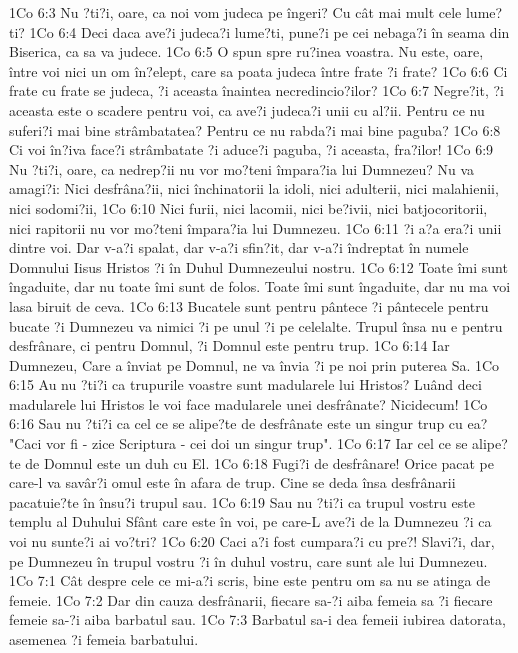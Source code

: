 1Co 6:3  Nu ?ti?i, oare, ca noi vom judeca pe îngeri? Cu cât mai mult cele lume?ti?
1Co 6:4  Deci daca ave?i judeca?i lume?ti, pune?i pe cei nebaga?i în seama din Biserica, ca sa va judece.
1Co 6:5  O spun spre ru?inea voastra. Nu este, oare, între voi nici un om în?elept, care sa poata judeca între frate ?i frate?
1Co 6:6  Ci frate cu frate se judeca, ?i aceasta înaintea necredincio?ilor?
1Co 6:7  Negre?it, ?i aceasta este o scadere pentru voi, ca ave?i judeca?i unii cu al?ii. Pentru ce nu suferi?i mai bine strâmbatatea? Pentru ce nu rabda?i mai bine paguba?
1Co 6:8  Ci voi în?iva face?i strâmbatate ?i aduce?i paguba, ?i aceasta, fra?ilor!
1Co 6:9  Nu ?ti?i, oare, ca nedrep?ii nu vor mo?teni împara?ia lui Dumnezeu? Nu va amagi?i: Nici desfrâna?ii, nici închinatorii la idoli, nici adulterii, nici malahienii, nici sodomi?ii,
1Co 6:10  Nici furii, nici lacomii, nici be?ivii, nici batjocoritorii, nici rapitorii nu vor mo?teni împara?ia lui Dumnezeu.
1Co 6:11  ?i a?a era?i unii dintre voi. Dar v-a?i spalat, dar v-a?i sfin?it, dar v-a?i îndreptat în numele Domnului Iisus Hristos ?i în Duhul Dumnezeului nostru.
1Co 6:12  Toate îmi sunt îngaduite, dar nu toate îmi sunt de folos. Toate îmi sunt îngaduite, dar nu ma voi lasa biruit de ceva.
1Co 6:13  Bucatele sunt pentru pântece ?i pântecele pentru bucate ?i Dumnezeu va nimici ?i pe unul ?i pe celelalte. Trupul însa nu e pentru desfrânare, ci pentru Domnul, ?i Domnul este pentru trup.
1Co 6:14  Iar Dumnezeu, Care a înviat pe Domnul, ne va învia ?i pe noi prin puterea Sa.
1Co 6:15  Au nu ?ti?i ca trupurile voastre sunt madularele lui Hristos? Luând deci madularele lui Hristos le voi face madularele unei desfrânate? Nicidecum!
1Co 6:16  Sau nu ?ti?i ca cel ce se alipe?te de desfrânate este un singur trup cu ea? "Caci vor fi - zice Scriptura - cei doi un singur trup".
1Co 6:17  Iar cel ce se alipe?te de Domnul este un duh cu El.
1Co 6:18  Fugi?i de desfrânare! Orice pacat pe care-l va savâr?i omul este în afara de trup. Cine se deda însa desfrânarii pacatuie?te în însu?i trupul sau.
1Co 6:19  Sau nu ?ti?i ca trupul vostru este templu al Duhului Sfânt care este în voi, pe care-L ave?i de la Dumnezeu ?i ca voi nu sunte?i ai vo?tri?
1Co 6:20  Caci a?i fost cumpara?i cu pre?! Slavi?i, dar, pe Dumnezeu în trupul vostru ?i în duhul vostru, care sunt ale lui Dumnezeu.
1Co 7:1  Cât despre cele ce mi-a?i scris, bine este pentru om sa nu se atinga de femeie.
1Co 7:2  Dar din cauza desfrânarii, fiecare sa-?i aiba femeia sa ?i fiecare femeie sa-?i aiba barbatul sau.
1Co 7:3  Barbatul sa-i dea femeii iubirea datorata, asemenea ?i femeia barbatului.
